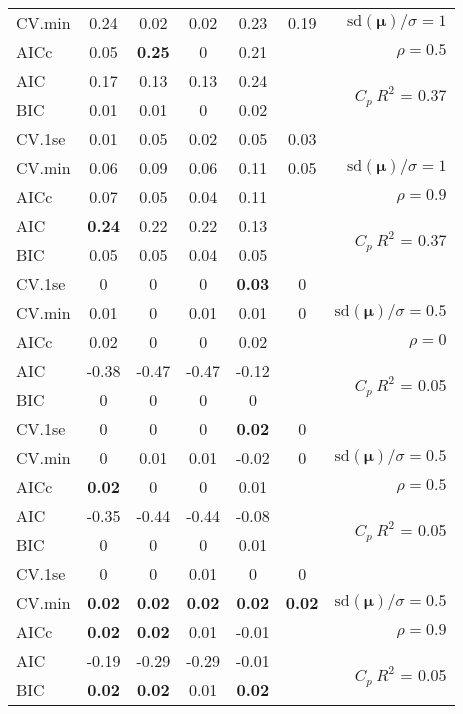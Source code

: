 \documentclass[12pt]{article}
\newcommand{\mr}[1]{\mathrm{#1}}
\newcommand{\bm}[1]{\mathbf{#1}}
\begin{document}
\begin{table}[p]
\begin{center}
\begin{tabular}{l*{5}{c}|r}
CV.min & 0.24 & 0.02 & 0.02 & 0.23 & 0.19 &  $\mr{sd}(\bm{\mu})/\sigma=1$ \\
AICc & 0.05 & {\bf 0.25} & 0 & 0.21 & & $\rho=0.5$ \\
AIC & 0.17 & 0.13 & 0.13 & 0.24 & & \multirow{2}{*}{$C_p ~ R^2$ = 0.37} \\
BIC & 0.01 & 0.01 & 0 & 0.02 & & \\
 \hline 
CV.1se & 0.01 & 0.05 & 0.02 & 0.05 & 0.03 &\\
CV.min & 0.06 & 0.09 & 0.06 & 0.11 & 0.05 &  $\mr{sd}(\bm{\mu})/\sigma=1$ \\
AICc & 0.07 & 0.05 & 0.04 & 0.11 & & $\rho=0.9$ \\
AIC & {\bf 0.24} & 0.22 & 0.22 & 0.13 & & \multirow{2}{*}{$C_p ~ R^2$ = 0.37} \\
BIC & 0.05 & 0.05 & 0.04 & 0.05 & & \\
 \hline 
CV.1se & 0 & 0 & 0 & {\bf 0.03} & 0 &\\
CV.min & 0.01 & 0 & 0.01 & 0.01 & 0 &  $\mr{sd}(\bm{\mu})/\sigma=0.5$ \\
AICc & 0.02 & 0 & 0 & 0.02 & & $\rho=0$ \\
AIC & -0.38 & -0.47 & -0.47 & -0.12 & & \multirow{2}{*}{$C_p ~ R^2$ = 0.05} \\
BIC & 0 & 0 & 0 & 0 & & \\
 \hline 
CV.1se & 0 & 0 & 0 & {\bf 0.02} & 0 &\\
CV.min & 0 & 0.01 & 0.01 & -0.02 & 0 &  $\mr{sd}(\bm{\mu})/\sigma=0.5$ \\
AICc & {\bf 0.02} & 0 & 0 & 0.01 & & $\rho=0.5$ \\
AIC & -0.35 & -0.44 & -0.44 & -0.08 & & \multirow{2}{*}{$C_p ~ R^2$ = 0.05} \\
BIC & 0 & 0 & 0 & 0.01 & & \\
 \hline 
CV.1se & 0 & 0 & 0.01 & 0 & 0 &\\
CV.min & {\bf 0.02} & {\bf 0.02} & {\bf 0.02} & {\bf 0.02} & {\bf 0.02} &  $\mr{sd}(\bm{\mu})/\sigma=0.5$ \\
AICc & {\bf 0.02} & {\bf 0.02} & 0.01 & -0.01 & & $\rho=0.9$ \\
AIC & -0.19 & -0.29 & -0.29 & -0.01 & & \multirow{2}{*}{$C_p ~ R^2$ = 0.05} \\
BIC & {\bf 0.02} & {\bf 0.02} & 0.01 & {\bf 0.02} & & \\
 \hline 
\end{tabular}
\end{center}
\vspace{-1cm}
\end{table}
\end{document}
